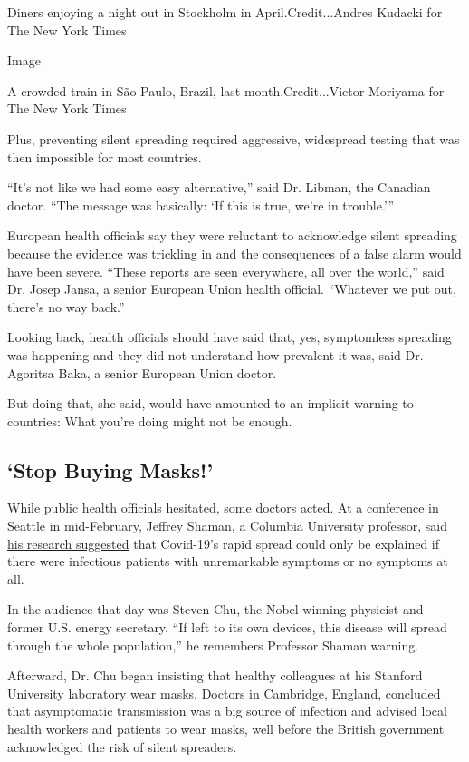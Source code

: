 Diners enjoying a night out in Stockholm in April.Credit...Andres
Kudacki for The New York Times

Image

A crowded train in São Paulo, Brazil, last month.Credit...Victor
Moriyama for The New York Times

Plus, preventing silent spreading required aggressive, widespread
testing that was then impossible for most countries.

``It's not like we had some easy alternative,'' said Dr. Libman, the
Canadian doctor. ``The message was basically: `If this is true, we're in
trouble.'''

European health officials say they were reluctant to acknowledge silent
spreading because the evidence was trickling in and the consequences of
a false alarm would have been severe. ``These reports are seen
everywhere, all over the world,'' said Dr. Josep Jansa, a senior
European Union health official. ``Whatever we put out, there's no way
back.''

Looking back, health officials should have said that, yes, symptomless
spreading was happening and they did not understand how prevalent it
was, said Dr. Agoritsa Baka, a senior European Union doctor.

But doing that, she said, would have amounted to an implicit warning to
countries: What you're doing might not be enough.

\hypertarget{stop-buying-masks}{%
\subsection{`Stop Buying Masks!'}\label{stop-buying-masks}}

While public health officials hesitated, some doctors acted. At a
conference in Seattle in mid-February, Jeffrey Shaman, a Columbia
University professor, said
\href{https://science.sciencemag.org/content/368/6490/489}{his research
suggested} that Covid-19's rapid spread could only be explained if there
were infectious patients with unremarkable symptoms or no symptoms at
all.

In the audience that day was Steven Chu, the Nobel-winning physicist and
former U.S. energy secretary. ``If left to its own devices, this disease
will spread through the whole population,'' he remembers Professor
Shaman warning.

Afterward, Dr. Chu began insisting that healthy colleagues at his
Stanford University laboratory wear masks. Doctors in Cambridge,
England, concluded that asymptomatic transmission was a big source of
infection and advised local health workers and patients to wear masks,
well before the British government acknowledged the risk of silent
spreaders.

